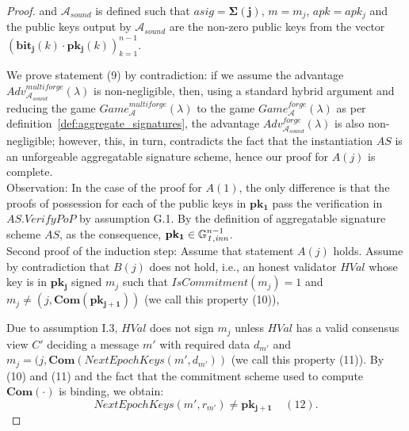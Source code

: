 \begin{proof}
\noindent and $\mathcal{A}_{\mathit{sound}}$ is defined such that $\mathit{asig} = \mathbf{\Sigma(j)}$, $m = m_j$, 
$\mathit{apk} = \mathit{apk_j}$ and the public keys output by $\mathcal{A}_{\mathit{sound}}$ are the non-zero public 
keys from the vector $(\mathbf{bit_j}(k) \cdot \mathbf{pk_j}(k))_{k=1}^{n-1}$.

\noindent We prove statement (9) by contradiction: if we assume the advantage 
$\mathit{Adv}^{\mathit{multiforge}}_{\mathcal{A}_{\mathit{sound}}}({\lambda})$ is non-negligible, 
then, using a standard hybrid argument and reducing the game 
$\mathit{Game}^{\mathit{multiforge}}_{\mathcal{A}}({\lambda})$ to the game 
$\mathit{Game}^{\mathit{forge}}_{\mathcal{A}}({\lambda})$ as per definition~\ref{def:aggregate_signatures}, 
the advantage $\mathit{Adv}^{\mathit{forge}}_{\mathcal{A}_{\mathit{sound}}}({\lambda})$ is also non-negligible; 
however, this, in turn, contradicts the fact that the instantiation $\mathit{AS}$ is an unforgeable 
aggregatable signature scheme, hence our proof for $A(j)$ is complete.  \\

\noindent Observation: In the case of the proof for $A(1)$, the only difference is that the proofs of possession for each of the public 
keys in $\mathbf{pk_1}$ pass the verification in $\mathit{AS.VerifyPoP}$ by assumption G.1. By the definition of aggregatable signature 
scheme $\mathit{AS}$, as the consequence, $\mathbf{pk_1} \in \mathbb{G}_{\mathit{1,inn}}^{n-1}$.\\

\noindent Second proof of the induction step: Assume that statement $A(j)$ holds. 
 Assume by contradiction that $B(j)$ does not hold, i.e., an honest validator $\mathit{HVal}$ whose key is in $\mathbf{pk_j}$ signed $m_j$ such that 
$\mathit{IsCommitment}(m_j) = 1$ and $m_j \neq (j, \mathbf{Com}(\mathbf{pk_{j+1}}))$ (we call this property (10)),

\noindent Due to assumption I.3, $\mathit{HVal}$ does not sign $m_j$ unless $\mathit{HVal}$ has a valid consensus view $C'$ deciding 
a message $m'$ with required data $d_{m'}$ and $m_j = (j, \mathbf{Com}(\mathit{NextEpochKeys}(m', d_{m'}))$ 
(we call this property (11)). By (10) and (11) and the fact that the commitment scheme used to compute $\mathbf{Com}(\cdot)$ is binding,  we obtain:
$$\mathit{NextEpochKeys}(m', r_{m'}) \neq \mathbf{pk_{j+1}} \ \ \ \ \ (12).$$



\end{proof}
